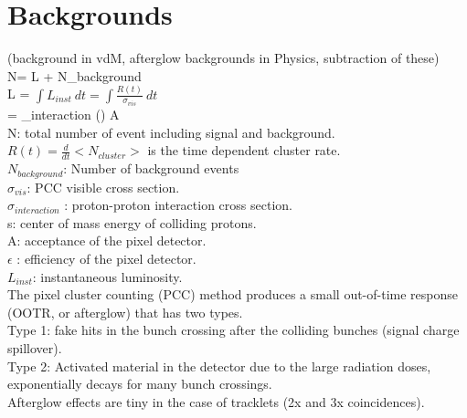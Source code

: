 \section{Backgrounds}
\label{sec:bkg}
(background in vdM, afterglow backgrounds in Physics, subtraction of these) \\

N= \sigma \:L + N_{background} \\

L = $ \int L_{inst} \: dt = \int \frac{R(t)}{\sigma_{vis}} \:dt $  \\

\sigma = \sigma_{interaction} () \: A \:\epsilon\\

N: total number of event including signal and background. \\

$R(t) = \frac{d}{dt} <N_{cluster}>$ is the time dependent cluster rate. \\

$N_{background}$: Number of background events \\

$\sigma_{vis}$: PCC visible cross section.\\

$\sigma_{interaction}$ : proton-proton interaction cross section. \\

s: center of mass energy of colliding protons. \\

A: acceptance of the pixel detector. \\

$\epsilon$ : efficiency of the pixel detector. \\

$L_{inst}$: instantaneous luminosity.\\

The pixel cluster counting (PCC) method produces a small out-of-time response (OOTR, or afterglow) that has two types.\\

Type 1: fake hits in the bunch crossing after the colliding bunches (signal charge spillover).\\

Type 2: Activated material in the detector due to the large radiation doses, exponentially decays for many bunch crossings.\\

Afterglow effects are tiny in the case of tracklets (2x and 3x coincidences).\\

